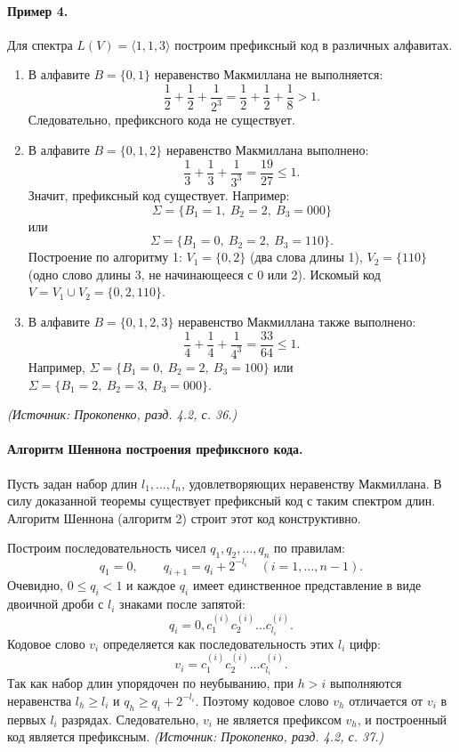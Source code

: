 \documentclass[a4paper,12pt]{article}
\begin{document}
\paragraph{Пример 4.}
Для спектра \(L(V)=\langle1,1,3\rangle\) построим префиксный код в различных алфавитах.
\begin{enumerate}[label=\arabic*)]
\item В алфавите \(B=\{0,1\}\) неравенство Макмиллана не выполняется:
\[
\frac{1}{2}+\frac{1}{2}+\frac{1}{2^3}=\frac{1}{2}+\frac{1}{2}+\frac{1}{8}>1.
\]
Следовательно, префиксного кода не существует.

\item В алфавите \(B=\{0,1,2\}\) неравенство Макмиллана выполнено:
\[
\frac{1}{3}+\frac{1}{3}+\frac{1}{3^3}=\frac{19}{27}\le 1.
\]
Значит, префиксный код существует. Например:
\[
\Sigma=\{B_1=1,\ B_2=2,\ B_3=000\}
\]
или
\[
\Sigma=\{B_1=0,\ B_2=2,\ B_3=110\}.
\]
Построение по алгоритму 1: \(V_1=\{0,2\}\) (два слова длины 1), \(V_2=\{110\}\) (одно слово длины 3, не начинающееся с 0 или 2). Искомый код \(V=V_1\cup V_2=\{0,2,110\}\).

\item В алфавите \(B=\{0,1,2,3\}\) неравенство Макмиллана также выполнено:
\[
\frac{1}{4}+\frac{1}{4}+\frac{1}{4^3}=\frac{33}{64}\le 1.
\]
Например, \(\Sigma=\{B_1=0,\ B_2=2,\ B_3=100\}\) или \(\Sigma=\{B_1=2,\ B_2=3,\ B_3=000\}\).
\end{enumerate}
\textit{(Источник: Прокопенко, разд. 4.2, с. 36.)}

\paragraph{Алгоритм Шеннона построения префиксного кода.}
Пусть задан набор длин \(l_1,\dots,l_n\), удовлетворяющих неравенству Макмиллана. В силу доказанной теоремы существует префиксный код с таким спектром длин. Алгоритм Шеннона (алгоритм 2) строит этот код конструктивно.

Построим последовательность чисел \(q_1,q_2,\dots,q_n\) по правилам:
\[
q_1=0,\qquad q_{i+1}=q_i+2^{-l_i}\quad (i=1,\dots,n-1).
\]
Очевидно, \(0\le q_i<1\) и каждое \(q_i\) имеет единственное представление в виде двоичной дроби с \(l_i\) знаками после запятой:
\[
q_i=0,c_1^{(i)}c_2^{(i)}\dots c_{l_i}^{(i)}.
\]
Кодовое слово \(v_i\) определяется как последовательность этих \(l_i\) цифр:
\[
v_i=c_1^{(i)}c_2^{(i)}\dots c_{l_i}^{(i)}.
\]
Так как набор длин упорядочен по неубыванию, при \(h>i\) выполняются неравенства \(l_h\ge l_i\) и \(q_h\ge q_i+2^{-l_i}\). Поэтому кодовое слово \(v_h\) отличается от \(v_i\) в первых \(l_i\) разрядах. Следовательно, \(v_i\) не является префиксом \(v_h\), и построенный код является префиксным.
\textit{(Источник: Прокопенко, разд. 4.2, с. 37.)}
\end{document}
